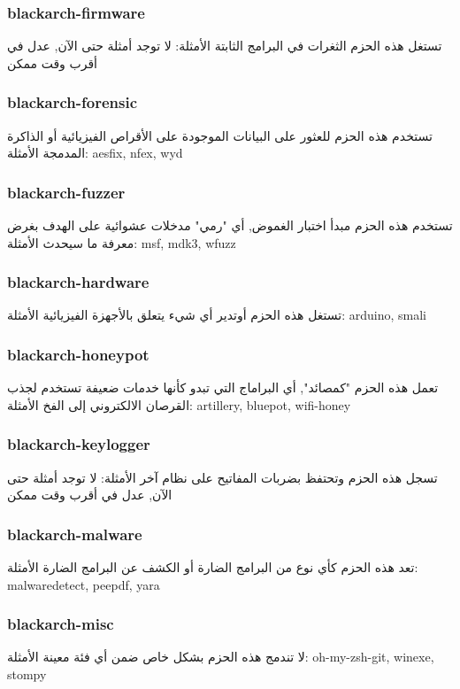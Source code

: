 \documentclass[a4paper, oneside, 11pt]{book}
\begin{document}
\subsubsection{blackarch-firmware}
تستغل هذه الحزم الثغرات في البرامج الثابتة 
الأمثلة: لا توجد أمثلة حتى الآن, عدل في أقرب وقت ممكن

\subsubsection{blackarch-forensic}
تستخدم هذه الحزم للعثور على البيانات الموجودة على الأقراص الفيزيائية أو الذاكرة المدمجة  
الأمثلة: aesfix, nfex, wyd 


\subsubsection{blackarch-fuzzer}
تستخدم هذه الحزم مبدأ اختبار الغموض, أي "رمي" مدخلات عشوائية على الهدف بغرض معرفة ما سيحدث
الأمثلة: msf, mdk3, wfuzz 


\subsubsection{blackarch-hardware}
تستغل هذه الحزم أوتدير أي شيء يتعلق بالأجهزة الفيزيائية
الأمثلة: arduino, smali


\subsubsection{blackarch-honeypot}
تعمل هذه الحزم "كمصائد", أي البراماج التي تبدو كأنها خدمات ضعيفة تستخدم لجذب القرصان الالكتروني إلى الفخ
الأمثلة: artillery, bluepot, wifi-honey

\subsubsection{blackarch-keylogger}
تسجل هذه الحزم وتحتفظ بضربات المفاتيح على نظام آخر
الأمثلة: لا توجد أمثلة حتى الآن, عدل في أقرب وقت ممكن


\subsubsection{blackarch-malware}
تعد هذه الحزم كأي نوع من البرامج الضارة أو الكشف عن البرامج الضارة
الأمثلة: malwaredetect, peepdf, yara

\subsubsection{blackarch-misc}
لا تندمج هذه الحزم بشكل خاص ضمن أي فئة معينة
الأمثلة: oh-my-zsh-git, winexe, stompy 
\end{document}
